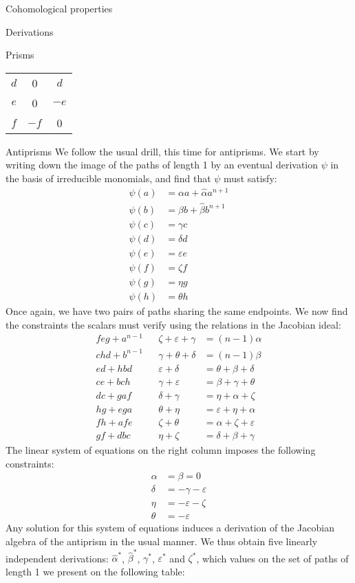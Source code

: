 \begin{chapter}{Cohomological properties}
\begin{section}{Derivations}
\begin{subsection}{Prisms}
\begin{center}
\begin{tabular}{ c | c | c }
$d$ & 	0		& $d$	\\
$e$ & 0		& $-e$ \\
$f$ & $-f$		& 0
\end{tabular}
\end{center}
\end{subsection}
\begin{subsection}{Antiprisms}
We follow the usual drill, this time for antiprisms. We start by writing down the image of the paths of length 1 by an eventual derivation $\psi$ in the basis of irreducible monomials, and find that $\psi$ must satisfy:
\begin{align*}
\psi(a) &= \alpha a +\hat\alpha a^{n+1}\\
\psi(b) &= \beta b + \hat\beta b^{n+1}\\
\psi(c) &= \gamma c \\
\psi(d) &= \delta d \\
\psi(e) &= \varepsilon e \\
\psi(f) &= \zeta f \\
\psi(g) &= \eta g \\
\psi(h) &= \theta h
\end{align*}
Once again, we have two pairs of paths sharing the same endpoints. We now find the constraints the scalars must verify using the relations in the Jacobian ideal:
\begin{align*}
feg+a^{n-1} &  	&\zeta+\varepsilon+\gamma 	&=(n-1)\alpha\\
chd+b^{n-1}  &  	&\gamma+\theta+\delta 		&=(n-1)\beta\\
ed+hbd	&	&\varepsilon+\delta		&=\theta+\beta+\delta\\
ce+bch	&	&\gamma+\varepsilon		&=\beta+\gamma+\theta\\
dc+gaf	&	&\delta+\gamma			&=\eta+\alpha+\zeta\\
hg+ega	&	&\theta+\eta			&=\varepsilon+\eta+\alpha\\
fh+afe	&	&\zeta+\theta			&=\alpha+\zeta+\varepsilon\\
gf+dbc	&	&\eta+\zeta				&=\delta+\beta+\gamma
\end{align*} 
The linear system of equations on the right column imposes the following constraints:
\begin{align*}
\alpha&=\beta=0\\
\delta&=-\gamma-\varepsilon\\
\eta&=-\varepsilon-\zeta\\
\theta&=-\varepsilon
\end{align*}
Any solution for this system of equations induces a derivation of the Jacobian algebra of the antiprism in the usual manner. We thus obtain five linearly independent derivations: $\hat\alpha^*$, $\hat\beta^*$, $\gamma^*$, $\varepsilon^*$ and $\zeta^*$, which values on the set of paths of length 1 we present on the following table:

\end{subsection}
\end{section}
\end{chapter}
